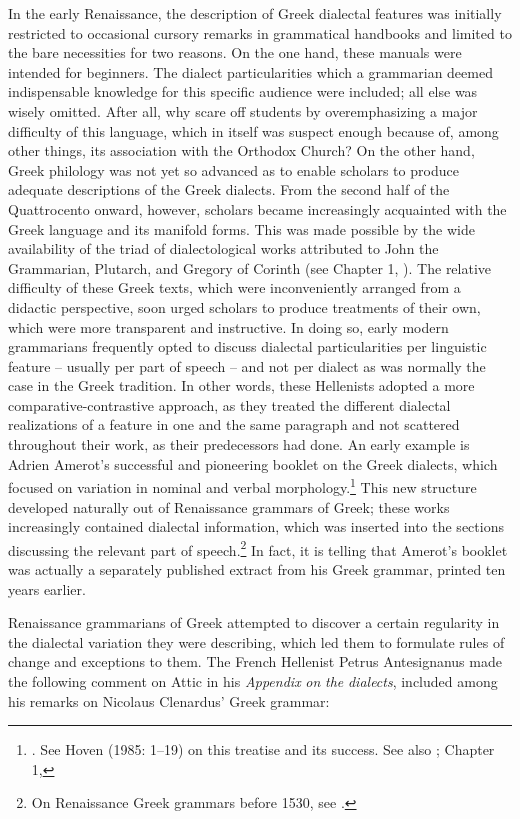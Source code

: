 In the early Renaissance, the description of Greek dialectal features was initially restricted to occasional cursory remarks in grammatical handbooks and limited to the bare necessities for two reasons. On the one hand, these manuals were intended for beginners. The dialect particularities which a grammarian deemed indispensable knowledge for this specific audience were included; all else was wisely omitted. After all, why scare off students by overemphasizing a major difficulty of this language, which in itself was suspect enough because of, among other things, its association with the Orthodox Church? On the other hand, Greek philology was not yet so advanced as to enable scholars to produce adequate descriptions of the Greek dialects. From the second half of the Quattrocento onward, however, scholars became increasingly acquainted with the Greek language and its manifold forms. This was made possible by the wide availability of the triad of dialectological works attributed to John the Grammarian, Plutarch, and Gregory of Corinth (see Chapter 1, ). The relative difficulty of these Greek texts, which were inconveniently arranged from a didactic perspective, soon urged scholars to produce treatments of their own, which were more transparent and instructive. In doing so, early modern grammarians frequently opted to discuss dialectal particularities per linguistic feature – usually per part of speech – and not per dialect as was normally the case in the Greek tradition. In other words, these Hellenists adopted a more comparative-contrastive approach, as they treated the different dialectal realizations of a feature in one and the same paragraph and not scattered throughout their work, as their predecessors had done. An early example is Adrien Amerot’s successful and pioneering booklet on the Greek dialects, which focused on variation in nominal and verbal morphology.\footnote{ \textrm{\citet{Amerot1530}. See Hoven (1985: 1–19) on this treatise and its success. See also \citet{Hummel1999}; Chapter 1, }} This new structure developed naturally out of Renaissance grammars of Greek; these works increasingly contained dialectal information, which was inserted into the sections discussing the relevant part of speech.\footnote{ \textrm{On Renaissance Greek grammars before 1530, see \citet{Botley2010}.}} In fact, it is telling that Amerot’s booklet was actually a separately published extract from his Greek grammar, printed ten years earlier.

Renaissance grammarians of Greek attempted to discover a certain regularity in the dialectal variation they were describing, which led them to formulate rules of change and exceptions to them. The French Hellenist Petrus Antesignanus made the following comment on Attic in his \textit{Appendix} \textit{on} \textit{the} \textit{dialects}, included among his remarks on Nicolaus Clenardus’ Greek grammar:

